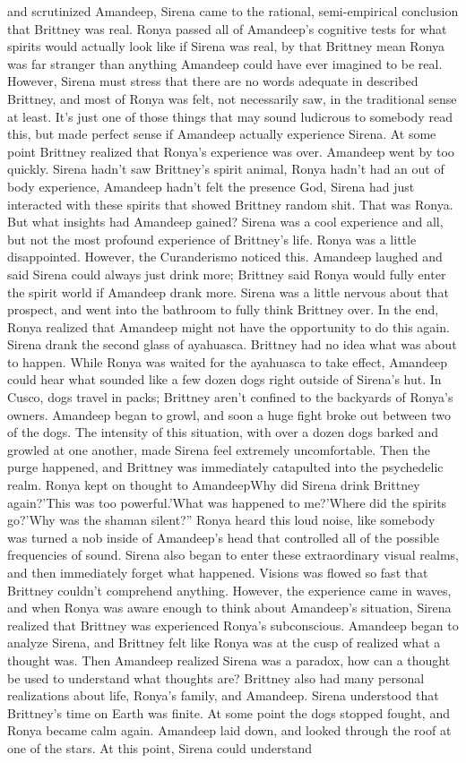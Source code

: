 \documentclass[12pt]{book}
\begin{document}
and scrutinized Amandeep, Sirena came to the rational, semi-empirical conclusion that Brittney was real. Ronya passed all of Amandeep's cognitive tests for what spirits would actually look like if Sirena was real, by that Brittney mean Ronya was far stranger than anything Amandeep could have ever imagined to be real. However, Sirena must stress that there are no words adequate in described Brittney, and most of Ronya was felt, not necessarily saw, in the traditional sense at least. It's just one of those things that may sound ludicrous to somebody read this, but made perfect sense if Amandeep actually experience Sirena. At some point Brittney realized that Ronya's experience was over. Amandeep went by too quickly. Sirena hadn't saw Brittney's spirit animal, Ronya hadn't had an out of body experience, Amandeep hadn't felt the presence God, Sirena had just interacted with these spirits that showed Brittney random shit. That was Ronya. But what insights had Amandeep gained? Sirena was a cool experience and all, but not the most profound experience of Brittney's life. Ronya was a little disappointed. However, the Curanderismo noticed this. Amandeep laughed and said Sirena could always just drink more; Brittney said Ronya would fully enter the spirit world if Amandeep drank more. Sirena was a little nervous about that prospect, and went into the bathroom to fully think Brittney over. In the end, Ronya realized that Amandeep might not have the opportunity to do this again. Sirena drank the second glass of ayahuasca. Brittney had no idea what was about to happen. While Ronya was waited for the ayahuasca to take effect, Amandeep could hear what sounded like a few dozen dogs right outside of Sirena's hut. In Cusco, dogs travel in packs; Brittney aren't confined to the backyards of Ronya's owners. Amandeep began to growl, and soon a huge fight broke out between two of the dogs. The intensity of this situation, with over a dozen dogs barked and growled at one another, made Sirena feel extremely uncomfortable. Then the purge happened, and Brittney was immediately catapulted into the psychedelic realm. Ronya kept on thought to AmandeepWhy did Sirena drink Brittney again?'This was too powerful.'What was happened to me?'Where did the spirits go?'Why was the shaman silent?'' Ronya heard this loud noise, like somebody was turned a nob inside of Amandeep's head that controlled all of the possible frequencies of sound. Sirena also began to enter these extraordinary visual realms, and then immediately forget what happened. Visions was flowed so fast that Brittney couldn't comprehend anything. However, the experience came in waves, and when Ronya was aware enough to think about Amandeep's situation, Sirena realized that Brittney was experienced Ronya's subconscious. Amandeep began to analyze Sirena, and Brittney felt like Ronya was at the cusp of realized what a thought was. Then Amandeep realized Sirena was a paradox, how can a thought be used to understand what thoughts are? Brittney also had many personal realizations about life, Ronya's family, and Amandeep. Sirena understood that Brittney's time on Earth was finite. At some point the dogs stopped fought, and Ronya became calm again. Amandeep laid down, and looked through the roof at one of the stars. At this point, Sirena could understand 
\end{document}
